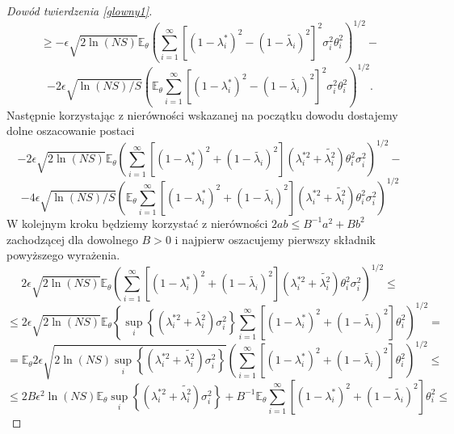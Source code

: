 \documentclass{mwart}
\begin{document}
\begin{proof}[Dowód twierdzenia \ref{glowny1}]
\begin{displaymath}
\geq -\epsilon\sqrt{2\ln (NS)}\mathbb{E}_{\theta}\left(\sum_{i=1}^{\infty}[(1-\lambda_i^*)^2-(1-\tilde{\lambda_i})^2]^2\sigma_i^2\theta_i^2\right)^{1/2}-
\end{displaymath}
\begin{displaymath}
-2\epsilon\sqrt{\ln (NS)/S}\left(\mathbb{E}_{\theta}\sum_{i=1}^{\infty}[(1-\lambda_i^*)^2-(1-\tilde{\lambda_i})^2]^2\sigma_i^2\theta_i^2\right)^{1/2}.
\end{displaymath}
Następnie korzystając z nierówności wskazanej na początku dowodu dostajemy dolne oszacowanie postaci
\begin{displaymath}
-2\epsilon\sqrt{2\ln (NS)}\mathbb{E}_{\theta}\left(\sum_{i=1}^{\infty}[(1-\lambda_i^*)^2+(1-\tilde{\lambda_i})^2](\lambda_i^{*2}+\tilde{\lambda_i^2})\theta_i^2\sigma_i^2\right)^{1/2}-
\end{displaymath}
\begin{displaymath}
-4\epsilon\sqrt{\ln (NS)/S}\left(\mathbb{E}_{\theta}\sum_{i=1}^{\infty}[(1-\lambda_i^*)^2+(1-\tilde{\lambda_i})^2](\lambda_i^{*2}+\tilde{\lambda_i^2})\theta_i^2\sigma_i^2\right)^{1/2}
\end{displaymath}
W kolejnym kroku będziemy korzystać z nierówności $2ab\leq B^{-1}a^2+Bb^2$ zachodzącej dla dowolnego $B>0$ i najpierw oszacujemy pierwszy składnik powyższego wyrażenia.
\begin{displaymath}
2\epsilon\sqrt{2\ln (NS)}\mathbb{E}_{\theta}\left(\sum_{i=1}^{\infty}[(1-\lambda_i^*)^2+(1-\tilde{\lambda_i})^2](\lambda_i^{*2}+\tilde{\lambda_i^2})\theta_i^2\sigma_i^2\right)^{1/2}\leq
\end{displaymath}
\begin{displaymath}
\leq 2\epsilon\sqrt{2\ln (NS)}\mathbb{E}_{\theta}\left\{\sup_i\left\{(\lambda_i^{*2}+\tilde{\lambda_i^2})\sigma_i^2\right\} \sum_{i=1}^{\infty}[(1-\lambda_i^*)^2+(1-\tilde{\lambda_i})^2]\theta_i^2\right)^{1/2}=
\end{displaymath}
\begin{displaymath}
=\mathbb{E}_{\theta}2\epsilon\sqrt{2\ln (NS)\sup_i\left\{(\lambda_i^{*2}+\tilde{\lambda_i^2})\sigma_i^2\right\}}\left(\sum_{i=1}^{\infty}[(1-\lambda_i^*)^2+(1-\tilde{\lambda_i})^2]\theta_i^2\right)^{1/2}\leq
\end{displaymath}
\begin{displaymath}
\leq 2B\epsilon^2 \ln (NS)\mathbb{E}_{\theta}\sup_i\left\{(\lambda_i^{*2}+\tilde{\lambda_i^2})\sigma_i^2\right\}+B^{-1}\mathbb{E}_{\theta}\sum_{i=1}^{\infty}[(1-\lambda_i^*)^2+(1-\tilde{\lambda_i})^2]\theta_i^2\leq
\end{displaymath}

\end{proof}
\end{document}
